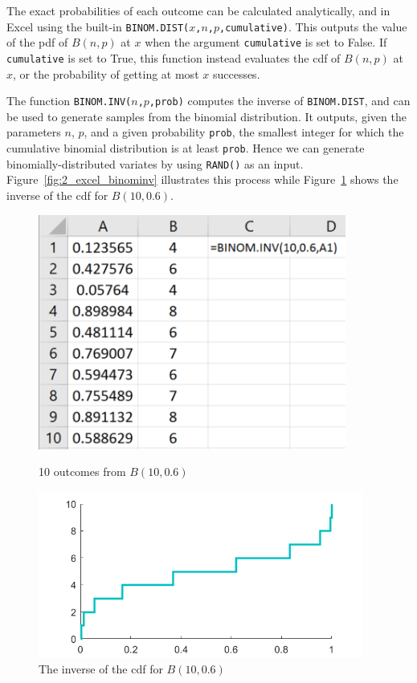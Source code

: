 The exact probabilities of each outcome can be calculated analytically, and in Excel using the built-in \texttt{BINOM.DIST($x$,$n$,$p$,cumulative)}. 
This outputs the value of the pdf of $B(n,p)$ at $x$ when the argument \texttt{cumulative} is set to False. 
If \texttt{cumulative} is set to True, this function instead evaluates the cdf of $B(n,p)$ at $x$, or the probability of getting at most $x$ successes.

The function \texttt{BINOM.INV($n$,$p$,prob)} computes the inverse of \texttt{BINOM.DIST}, and can be used to generate samples from the binomial distribution.
It outputs, given the parameters $n$, $p$, and a given probability \texttt{prob}, the smallest integer for which the cumulative binomial distribution is at least \texttt{prob}.
Hence we can generate binomially-distributed variates by using \texttt{RAND()} as an input.
Figure~\ref{fig:2_excel_binominv} illustrates this process while Figure~\ref{fig:2_binomial_cdf_inv} shows the inverse of the cdf for $B(10,0.6)$.

\begin{figure}[htbp]
\centering
 \begin{minipage}{.45\textwidth}
        \centering
	\includegraphics[width=0.9\textwidth]{fig/2_excel_binominv2.png}
	\captionsetup{font=small}
	\caption{10 outcomes from $B(10,0.6)$ \label{fig:2_excel_binominv}}
    \end{minipage}
    \begin{minipage}{0.55\textwidth}
        \centering
	\includegraphics[width=0.95\textwidth]{fig/2_binomial_cdf_inv.png}
	\captionsetup{font=small}
	\caption{The inverse of the cdf for $B(10,0.6)$ \label{fig:2_binomial_cdf_inv}}
    \end{minipage}	
\end{figure}


